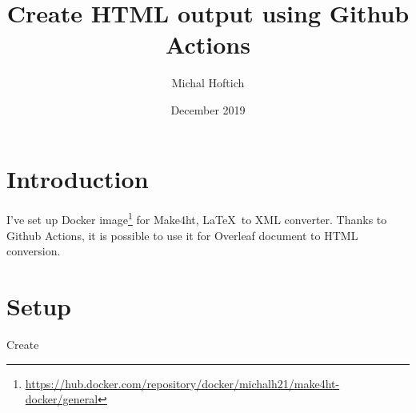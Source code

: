 \documentclass{article}
\title{Create HTML output using Github Actions}
\author{Michal Hoftich}
\date{December 2019}
\newcommand\footurl[1]{\footnote{\url{#1}}}
\begin{document}
\maketitle

\section{Introduction}

I've set up Docker image\footurl{https://hub.docker.com/repository/docker/michalh21/make4ht-docker/general} for Make4ht, \LaTeX\ to XML converter. Thanks to Github Actions, it is possible to use it for Overleaf document to HTML conversion.

\section{Setup}

Create 
\end{document}
